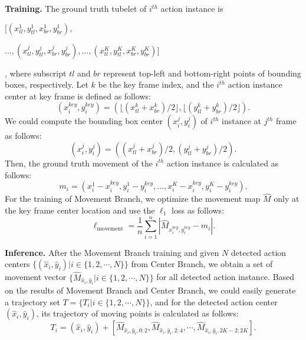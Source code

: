 \documentclass[runningheads]{llncs}
\begin{document}
\textbf{Training.} The ground truth tubelet of $i^{th}$ action instance is \begin{footnotesize}
$[(x_{tl}^1,y_{tl}^1,x_{br}^1,y_{br}^1),$

\noindent $...,(x_{tl}^j,y_{tl}^j,x_{br}^j,y_{br}^j),...,(x_{tl}^K,y_{tl}^K,x_{br}^K,y_{br}^K)]$
\end{footnotesize}
, where subscript $tl$ and $br$ represent top-left and bottom-right points of bounding boxes, respectively. Let $k$ be the key frame index, and the $i^{th}$ action instance center at key frame is defined as follows:
\begin{equation}
  (x^{key}_{i},y^{key}_{i})=(\lfloor(x_{tl}^{k}+x_{br}^{k})/2\rfloor,\lfloor(y_{tl}^{k}+y_{br}^{k})/2\rfloor).
\end{equation}
We could compute the bounding box center $(x_{i}^j,y_{i}^j)$ of $i^{th}$ instance at $j^{th}$ frame as follows:
\begin{equation}
  (x_{i}^{j},y_{i}^{j})=((x_{tl}^{j}+x_{br}^{j})/2,(y_{tl}^{j}+y_{br}^{j})/2).
  \end{equation}
Then, the ground truth movement of the $i^{th}$ action instance is calculated as follows:
\begin{equation}
m_i=(x_{i}^{1}-x^{key}_{i} ,y_{i}^{1}-y_{i}^{key},...,x_{i}^{K}-x_{i}^{key},y_{i}^{K}-y_{i}^{key}).
\end{equation}
For the training of Movement Branch, we optimize the movement map $\hat{M}$ only at the key frame center location and use the $\ell_1$ loss as follows:
\begin{equation}
  \ell_{\mathrm{movement}}=\frac{1}{n}\sum_{i=1}^{n}|\hat{M}_{x^{key}_i,y^{key}_i}-m_i|.
\end{equation}

\textbf{Inference.} After the Movement Branch training and given $N$ detected action centers $\{(\hat{x}_i,\hat{y}_i)| i \in \{1, 2, \cdots, N \}\}$ from Center Branch, we obtain a set of movement vector $\{\hat{M}_{\hat{x}_i,\hat{y}_i}|i\in \{1, 2, \cdots, N \}\}$ for all detected action instance. Based on the results of Movement Branch and Center Branch, we could easily generate a trajectory set $T=\{T_i| i\in \{1, 2, \cdots, N \} \}$, and for the detected action center $(\hat{x}_i,\hat{y}_i)$, its trajectory of moving points is calculated as follows:
\begin{equation}
    T_i=(\hat{x}_i,\hat{y}_i) + [\hat{M}_{\hat{x}_i,\hat{y}_i,0:2} , \hat{M}_{\hat{x}_i,\hat{y}_i,2:4}, \cdots, \hat{M}_{\hat{x}_i,\hat{y}_i,2K-2:2K}].
\end{equation}
\end{document}
